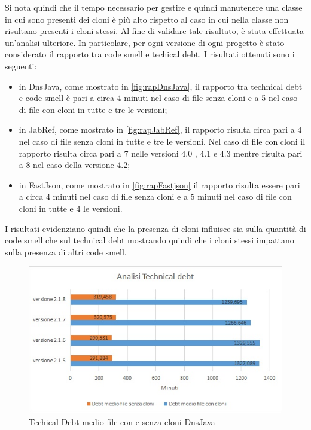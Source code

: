 Si nota quindi che il tempo necessario per gestire e quindi manutenere una classe in cui sono presenti dei cloni è più alto rispetto al caso in cui nella classe non risultano presenti i cloni stessi. Al fine di validare tale risultato, è stata effettuata un'analisi ulteriore. In particolare, per ogni versione di ogni progetto è stato considerato il rapporto tra code smell e techical debt. I risultati ottenuti sono i seguenti:
\begin{itemize}
	\item in DnsJava, come mostrato in \autoref{fig:rapDnsJava}, il rapporto tra technical debt e code smell è pari a circa 4 minuti nel caso di file senza cloni e a 5 nel caso di file con cloni in tutte e tre le versioni;
	\item in JabRef, come mostrato in \autoref{fig:rapJabRef}, il rapporto risulta circa pari a 4 nel caso di file senza cloni in tutte e tre le versioni. Nel caso di file con cloni il rapporto risulta circa pari a 7 nelle versioni 4.0 , 4.1 e 4.3 mentre risulta pari a 8 nel caso della versione 4.2;
	\item in FastJson, come mostrato in \autoref{fig:rapFastjson} il rapporto risulta essere pari a circa 4 minuti nel caso di file senza cloni e a 5 minuti nel caso di file con cloni in tutte e 4 le versioni.
\end{itemize}
I risultati evidenziano quindi che la presenza di cloni influisce sia sulla quantità di code smell che sul technical debt mostrando quindi che i cloni stessi impattano sulla presenza di altri code smell.
\begin{figure}[h]
	\centering
	\includegraphics[scale=0.7, trim = 0cm 0cm 0cm 0cm, clip=true]{Grafici_dnsJava/TechnicalDebt.jpg}
	\caption{Techical Debt medio file con e senza cloni DnsJava}
	\label{fig:tdDnsJava}	
\end{figure}
